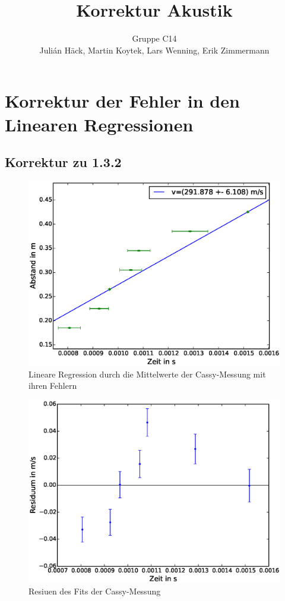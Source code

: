 \documentclass[12pt,a4paper]{article}
\author{Gruppe C14 \\ Julián Häck, Martin Koytek, Lars Wenning, Erik Zimmermann}
\title{Korrektur Akustik}
\begin{document}
\maketitle
\newpage
\section{Korrektur der Fehler in den Linearen Regressionen}
\subsection{Korrektur zu 1.3.2}
\begin{figure}[H]
\centering
\includegraphics[scale=0.65]{Bilder/Linreg-cassy-laufzeit.eps}
\caption{Lineare Regression durch die Mittelwerte der Cassy-Messung mit ihren Fehlern}
\end{figure}
\begin{figure}[H]
\centering
\includegraphics[scale=0.65]{Bilder/Residuum-cassy-Laufzeit.eps}
\caption{Resiuen des Fits der Cassy-Messung}
\end{figure}
\end{document}
